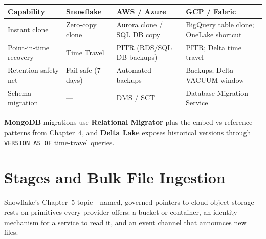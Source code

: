 \begin{center}
\footnotesize
\begin{tabular}{@{}p{2.8cm}p{3.0cm}p{3.0cm}p{3.4cm}@{}}
\toprule
\textbf{Capability} & \textbf{Snowflake} & \textbf{AWS / Azure} & \textbf{GCP / Fabric} \\
\midrule
Instant clone & Zero-copy clone & Aurora clone / SQL DB copy & BigQuery table clone; OneLake shortcut \\
Point-in-time recovery & Time Travel & PITR (RDS/SQL DB backups) & PITR; Delta time travel \\
Retention safety net & Fail-safe (7 days) & Automated backups & Backups; Delta VACUUM window \\
Schema migration & --- & DMS / SCT & Database Migration Service \\
\bottomrule
\end{tabular}
\end{center}

\noindent \textbf{MongoDB} migrations use \textbf{Relational Migrator} plus the embed-vs-reference
patterns from Chapter~4, and \textbf{Delta Lake} exposes historical versions through
\texttt{VERSION AS OF} time-travel queries.


\section{Stages and Bulk File Ingestion}
%
Snowflake's Chapter~5 topic---named, governed pointers to cloud object storage---rests on
primitives every provider offers: a bucket or container, an identity mechanism for a service to
read it, and an event channel that announces new files.

